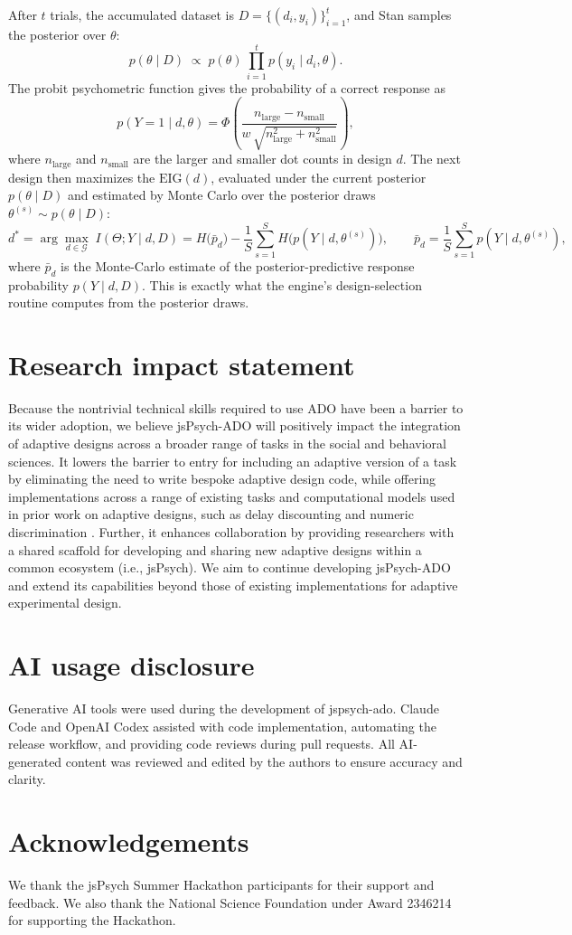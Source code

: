 After $t$ trials, the accumulated dataset is $D = \{(d_i, y_i)\}_{i=1}^{t}$, and Stan samples the posterior over $\theta$:
%
\[
  p(\theta \mid D) \;\propto\; p(\theta)\,\prod_{i=1}^{t} p(y_i \mid d_i, \theta).
\]
%
The probit psychometric function gives the probability of a correct response as
%
\[
  p(Y = 1 \mid d, \theta)
  = \Phi\!\left(\frac{n_{\text{large}} - n_{\text{small}}}
                     {w\,\sqrt{n_{\text{large}}^{2} + n_{\text{small}}^{2}}}\right),
\]
%
where $n_{\text{large}}$ and $n_{\text{small}}$ are the larger and smaller dot
counts in design $d$. The next design then maximizes the $\mathrm{EIG}(d)$, evaluated under the current posterior $p(\theta \mid D)$ and estimated by Monte Carlo over the posterior draws $\theta^{(s)} \sim p(\theta \mid D)$:
%
\[
  d^{*} = \arg\max_{d \in \mathcal{G}}\; I(\Theta; Y \mid d, D)
        = H\!\big(\bar{p}_d\big)
          - \frac{1}{S}\sum_{s=1}^{S} H\!\big(p(Y \mid d, \theta^{(s)})\big),
  \qquad
  \bar{p}_d = \frac{1}{S}\sum_{s=1}^{S} p(Y \mid d, \theta^{(s)}),
\]
%
where $\bar{p}_d$ is the Monte-Carlo estimate of the posterior-predictive response probability $p(Y \mid d, D)$. This is exactly what the engine's design-selection routine computes from the posterior draws.

\section{Research impact statement}
Because the nontrivial technical skills required to use ADO have been a barrier to its wider adoption, we believe jsPsych-ADO will positively impact the integration of adaptive designs across a broader range of tasks in the social and behavioral sciences.
It lowers the barrier to entry for including an adaptive version of a task by eliminating the need to write bespoke adaptive design code, while offering implementations across a range of existing tasks and computational models used in prior work on adaptive designs, such as delay discounting \citep{lee2026rapid} and numeric discrimination \citep{halberda2008individual}. 
Further, it enhances collaboration by providing researchers with a shared scaffold for developing and sharing new adaptive designs within a common ecosystem (i.e., jsPsych).
We aim to continue developing jsPsych-ADO and extend its capabilities beyond those of existing implementations for adaptive experimental design.

\section{AI usage disclosure}
Generative AI tools were used during the development of jspsych-ado. Claude Code and OpenAI Codex assisted with code implementation, automating the release workflow, and providing code reviews during pull requests. All AI-generated content was reviewed and edited by the authors to ensure accuracy and clarity.
\section{Acknowledgements}
We thank the jsPsych Summer Hackathon participants for their support and feedback.
We also thank the National Science Foundation under Award 2346214 for supporting the Hackathon.